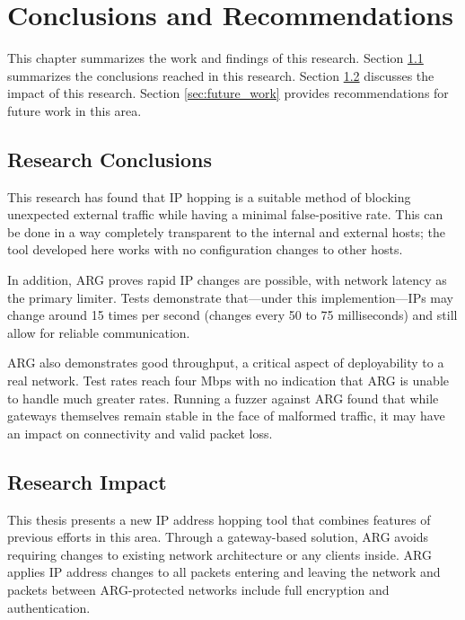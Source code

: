 \chapter{Conclusions and Recommendations}
\label{chp:conclusion}
\par This chapter summarizes the work and findings of this research. Section \ref{sec:research_conclusions} summarizes the conclusions reached in this research. Section \ref{sec:research_impact} discusses the impact of this research. Section \ref{sec:future_work} provides recommendations for future work in this area.

\section{Research Conclusions}
\label{sec:research_conclusions}
\par This research has found that \ac{IP} hopping is a suitable method of blocking unexpected external traffic while having a minimal false-positive rate. This can be done in a way completely transparent to the internal and external hosts; the tool developed here works with no configuration changes to other hosts.

\par In addition, \ac{ARG} proves rapid \ac{IP} changes are possible, with network latency as the primary limiter. Tests demonstrate that---under this implemention---\acp{IP} may change around 15 times per second (changes every 50 to 75 milliseconds) and still allow for reliable communication. 

\ac{ARG} also demonstrates good throughput, a critical aspect of deployability to a real network. Test rates reach four \ac{Mbps} with no indication that \ac{ARG} is unable to handle much greater rates. Running a fuzzer against \ac{ARG} found that while gateways themselves remain stable in the face of malformed traffic, it may have an impact on connectivity and valid packet loss.

\section{Research Impact}
\label{sec:research_impact}
\par This thesis presents a new \ac{IP} address hopping tool that combines features of previous efforts in this area. Through a gateway-based solution, \ac{ARG} avoids requiring changes to existing network architecture or any clients inside. \ac{ARG} applies \ac{IP} address changes to all packets entering and leaving the network and packets between \ac{ARG}-protected networks include full encryption and authentication.

